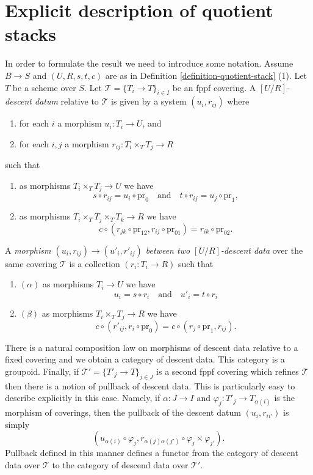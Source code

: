 \documentclass{stacks-project}
\theoremstyle{plain}
\theoremstyle{definition}
\theoremstyle{remark}
\numberwithin{equation}{subsection}
\begin{document}
\section{Explicit description of quotient stacks}
\label{section-explicit-quotient-stacks}

\noindent
In order to formulate the result we need to introduce some
notation. Assume $B \to S$ and $(U, R, s, t, c)$ are as in
Definition \ref{definition-quotient-stack} (1).
Let $T$ be a scheme over $S$. Let $\mathcal{T} = \{T_i \to T\}_{i \in I}$
be an fppf covering. A {\it $[U/R]$-descent datum} relative
to $\mathcal{T}$ is given by a system $(u_i, r_{ij})$ where
\begin{enumerate}
\item for each $i$ a morphism $u_i : T_i \to U$, and
\item for each $i, j$ a morphism $r_{ij} : T_i \times_T T_j \to R$
\end{enumerate}
such that
\begin{enumerate}
\item[(a)] as morphisms $T_i \times_T T_j \to U$ we have
$$
s \circ r_{ij} = u_i \circ \text{pr}_0
\quad\text{and}\quad
t \circ r_{ij} = u_j \circ \text{pr}_1,
$$
\item[(b)] as morphisms $T_i \times_T T_j \times_T T_k \to R$ we have
$$
c \circ (r_{jk} \circ \text{pr}_{12}, r_{ij} \circ \text{pr}_{01})
= r_{ik} \circ \text{pr}_{02}.
$$
\end{enumerate}
A {\it morphism $(u_i, r_{ij}) \to (u'_i, r'_{ij})$ between two
$[U/R]$-descent data} over the same covering $\mathcal{T}$
is a collection $(r_i : T_i \to R)$ such that
\begin{enumerate}
\item[] $(\alpha)$ as morphisms $T_i \to U$ we have
$$
u_i = s \circ r_i
\quad\text{and}\quad
u'_i = t \circ r_i
$$
\item[] $(\beta)$ as morphisms $T_i \times_T T_j \to R$ we have
$$
c \circ (r'_{ij}, r_i \circ \text{pr}_0)
=
c \circ (r_j \circ \text{pr}_1, r_{ij}).
$$
\end{enumerate}
There is a natural composition law on morphisms of descent data relative
to a fixed covering and we obtain a category of descent data.
This category is a groupoid. Finally, if
$\mathcal{T}' = \{T'_j \to T\}_{j \in J}$
is a second fppf covering which refines $\mathcal{T}$ then there
is a notion of pullback of descent data. This is particularly easy to
describe explicitly in this case. Namely, if $\alpha : J \to I$ and
$\varphi_j : T'_j \to T_{\alpha(i)}$ is the morphism of coverings, then
the pullback of the descent datum $(u_i, r_{ii'})$ is simply
$$
(u_{\alpha(i)} \circ \varphi_j,
r_{\alpha(j)\alpha(j')} \circ \varphi_j \times \varphi_{j'}).
$$
Pullback defined in this manner defines a functor from the category of
descent data over $\mathcal{T}$ to the category of descend data over
$\mathcal{T}'$.
\end{document}
